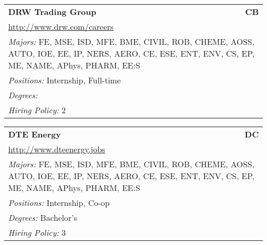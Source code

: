 \documentclass[twoside]{article}
\begin{document}
\begin{center}
\begin{multicols}{3}
\begin{FlushLeft}
\begin{minipage}{\columnwidth}
\end{minipage}
 
\begin{minipage}{\columnwidth}\begin{tabularx}{.95\columnwidth}{Xr}
                 {\Large\bf DRW Trading Group} & {\Large\bf CB}\\
    \multicolumn{2}{p{.95\columnwidth}}{\url{http://www.drw.com/careers}}\\
    \multicolumn{2}{p{.95\columnwidth}}{\emph{Majors:} FE, MSE, ISD, MFE, BME, CIVIL, ROB, CHEME, AOSS, AUTO, IOE, EE, IP, NERS, AERO, CE, ESE, ENT, ENV, CS, EP, ME, NAME, APhys, PHARM, EE:S}\\
    \multicolumn{2}{p{.95\columnwidth}}{\emph{Positions:} Internship, Full-time}\\
    \multicolumn{2}{p{.95\columnwidth}}{\emph{Degrees:} }\\
    \multicolumn{2}{p{.95\columnwidth}}{\emph{Hiring Policy:} 2}\\
    \end{tabularx}
    
\end{minipage}
 
\begin{minipage}{\columnwidth}\begin{tabularx}{.95\columnwidth}{Xr}
                 {\Large\bf DTE Energy} & {\Large\bf DC}\\
    \multicolumn{2}{p{.95\columnwidth}}{\url{http://www.dteenergy.jobs}}\\
    \multicolumn{2}{p{.95\columnwidth}}{\emph{Majors:} FE, MSE, ISD, MFE, BME, CIVIL, ROB, CHEME, AOSS, AUTO, IOE, EE, IP, NERS, AERO, CE, ESE, ENT, ENV, CS, EP, ME, NAME, APhys, PHARM, EE:S}\\
    \multicolumn{2}{p{.95\columnwidth}}{\emph{Positions:} Internship, Co-op}\\
    \multicolumn{2}{p{.95\columnwidth}}{\emph{Degrees:} Bachelor's}\\
    \multicolumn{2}{p{.95\columnwidth}}{\emph{Hiring Policy:} 3}\\
    \end{tabularx}
    
\end{minipage}
 

\end{FlushLeft}
\end{multicols}
\end{center}
\end{document}
